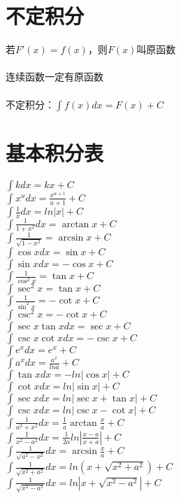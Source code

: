 \documentclass{article}
\begin{document}
\begin{flushleft}
	\LARGE


	\section{不定积分}
	
	若$F'(x)=f(x)$，则$F(x)$叫原函数\\
	~\\
	连续函数一定有原函数\\
	~\\
	不定积分：$\int f(x)dx=F(x)+C$\\
	
	\section{基本积分表}
	
	$\int kdx=kx+C$\\
	$\int x^udx=\frac{x^{u+1}}{u+1}+C$\\
	$\int \frac{1}{x}dx=ln|x|+C$\\
	$\int \frac{1}{1+x^2}dx=\arctan x+C$\\
	$\int \frac{1}{\sqrt{1-x^2}}=\arcsin x+C$\\
	$\int \cos xdx=\sin x+C$\\
	$\int \sin xdx=-\cos x+C$\\
	$\int \frac{1}{\cos^2x}=\tan x+C$\\
	$\int \sec^2x=\tan x+C$\\
	$\int \frac{1}{\sin^2x}=-\cot x+C$\\
	$\int \csc^2x=-\cot x+C$\\
	$\int \sec x\tan xdx=\sec x+C$\\
	$\int \csc x\cot xdx=-\csc x+C$\\
	$\int e^xdx=e^x+C$\\
	$\int a^xdx=\frac{a^x}{lna}+C$\\
	$\int \tan xdx=-ln|\cos x|+C$\\
	$\int \cot xdx=ln|\sin x|+C$\\
	$\int \sec xdx=ln|\sec x+\tan x|+C$\\
	$\int \csc xdx=ln|\csc x-\cot x|+C$\\
	$\int \frac{1}{a^2+x^2}dx=\frac{1}{a}\arctan \frac{x}{a}+C$\\
	$\int \frac{1}{x^2-a^2}dx=\frac{1}{2a}ln|\frac{x-a}{x+a}|+C$\\
	$\int \frac{1}{\sqrt{a^2-x^2}}dx=\arcsin \frac{x}{a}+C$\\
	$\int \frac{1}{\sqrt{x^2+a^2}}dx=ln(x+\sqrt{x^2+a^2})+C$\\
	$\int \frac{1}{\sqrt{x^2-a^2}}dx=ln|x+\sqrt{x^2-a^2}|+C$\\
	

\end{flushleft}
\end{document}
